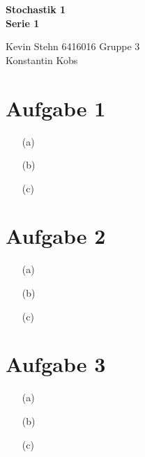 \documentclass[10pt,a4paper]{article}
\begin{document}
\begin{center}
\textbf{Stochastik 1 \\ Serie 1 \\}
\end{center}

\begin{flushright}
Kevin Stehn 6416016 Gruppe 3 \\
Konstantin Kobs
\end{flushright}

\section*{Aufgabe 1}
\begin{itemize}
\item[(a)]
\item[(b)]
\item[(c)]
\end{itemize}

\section*{Aufgabe 2}
\begin{itemize}
\item[(a)]
\item[(b)]
\item[(c)]
\end{itemize}

\section*{Aufgabe 3}
\begin{itemize}
\item[(a)]
\item[(b)]
\item[(c)]
\end{itemize}
\end{document}
